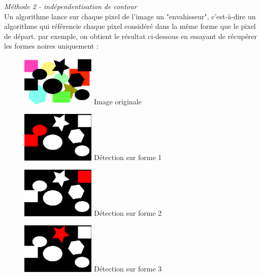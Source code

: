 \documentclass{article}
\begin{document}
			\newpage
			
			\emph{Méthode 2 - indépendentisation de contour}\\
			Un algorithme lance sur chaque pixel de l'image un "envahisseur", c'est-à-dire un algorithme qui référencie chaque pixel considéré dans la même forme que le pixel de départ. par exemple, on obtient le résultat ci-dessous en essayant de récupérer les formes noires uniquement :
			\begin{figure}[!ht]
				\centering
				\begin{minipage}[t]{3.5cm}
					\centering
					\includegraphics[width=3.5cm]{Vectorization/shape.jpg}
					Image originale
				\end{minipage}
				\begin{minipage}[t]{3.5cm}
					\centering
					\includegraphics[width=3.5cm]{Vectorization/shapeDetection1.jpg}
					Détection sur forme 1
				\end{minipage}
				\begin{minipage}[t]{3.5cm}
					\centering
					\includegraphics[width=3.5cm]{Vectorization/shapeDetection2.jpg}
					Détection sur forme 2
				\end{minipage}
				\begin{minipage}[t]{3.5cm}
					\centering
					\includegraphics[width=3.5cm]{Vectorization/shapeDetection3.jpg}
					Détection sur forme 3
				\end{minipage}
			\end{figure}\\
\end{document}
